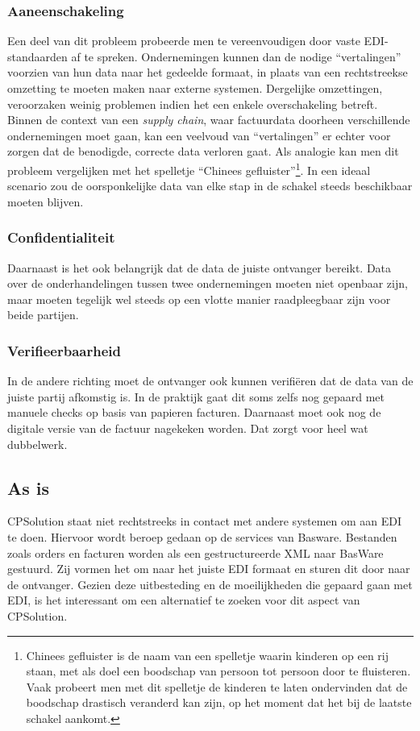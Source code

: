 \subsubsection{Aaneenschakeling}
Een deel van dit probleem probeerde men te vereenvoudigen door vaste EDI-standaarden af te spreken. Ondernemingen kunnen dan de nodige ``vertalingen'' voorzien van hun data naar het gedeelde formaat, in plaats van een rechtstreekse omzetting te moeten maken naar externe systemen. Dergelijke omzettingen, veroorzaken weinig problemen indien het een enkele overschakeling betreft. Binnen de context van een \textit{supply chain}, waar factuurdata doorheen verschillende ondernemingen moet gaan, kan een veelvoud van ``vertalingen'' er echter voor zorgen dat de benodigde, correcte data verloren gaat. Als analogie kan men dit probleem vergelijken met het spelletje ``Chinees gefluister''\footnote{Chinees gefluister is de naam van een spelletje waarin kinderen op een rij staan, met als doel een boodschap van persoon tot persoon door te fluisteren. Vaak probeert men met dit spelletje de kinderen te laten ondervinden dat de boodschap drastisch veranderd kan zijn, op het moment dat het bij de laatste schakel aankomt.}. In een ideaal scenario zou de oorsponkelijke data van elke stap in de schakel steeds beschikbaar moeten blijven.


\subsubsection{Confidentialiteit}
Daarnaast is het ook belangrijk dat de data de juiste ontvanger bereikt. Data over de onderhandelingen tussen twee ondernemingen moeten niet openbaar zijn, maar moeten tegelijk wel steeds op een vlotte manier raadpleegbaar zijn voor beide partijen.

\subsubsection{Verifieerbaarheid}

In de andere richting moet de ontvanger ook kunnen verifiëren dat de data van de juiste partij afkomstig is. In de praktijk gaat dit soms zelfs nog gepaard met manuele checks op basis van papieren facturen. Daarnaast moet ook nog de digitale versie van de factuur nagekeken worden. Dat zorgt voor heel wat dubbelwerk. 


\subsection{As is}
CPSolution staat niet rechtstreeks in contact met andere systemen om aan EDI te doen. Hiervoor wordt beroep gedaan op de services van Basware. Bestanden zoals orders en facturen worden als een gestructureerde XML naar BasWare gestuurd. Zij vormen het om naar het juiste EDI formaat en sturen dit door naar de ontvanger. Gezien deze uitbesteding en de moeilijkheden die gepaard gaan met EDI, is het interessant om een alternatief te zoeken voor dit aspect van CPSolution.




